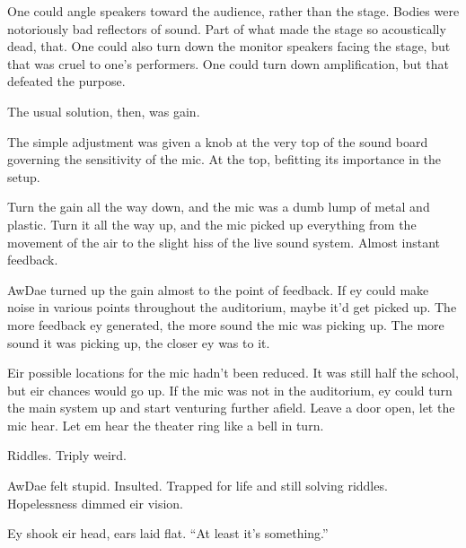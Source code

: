 One could angle speakers toward the audience, rather than the stage. Bodies were notoriously bad reflectors of sound. Part of what made the stage so acoustically dead, that. One could also turn down the monitor speakers facing the stage, but that was cruel to one's performers. One could turn down amplification, but that defeated the purpose.

The usual solution, then, was gain.

The simple adjustment was given a knob at the very top of the sound board governing the sensitivity of the mic. At the top, befitting its importance in the setup.

Turn the gain all the way down, and the mic was a dumb lump of metal and plastic. Turn it all the way up, and the mic picked up everything from the movement of the air to the slight hiss of the live sound system. Almost instant feedback.

AwDae turned up the gain almost to the point of feedback. If ey could make noise in various points throughout the auditorium, maybe it'd get picked up. The more feedback ey generated, the more sound the mic was picking up. The more sound it was picking up, the closer ey was to it.

Eir possible locations for the mic hadn't been reduced. It was still half the school, but eir chances would go up. If the mic was not in the auditorium, ey could turn the main system up and start venturing further afield. Leave a door open, let the mic hear. Let em hear the theater ring like a bell in turn.

Riddles. Triply weird.

AwDae felt stupid. Insulted. Trapped for life and still solving riddles. Hopelessness dimmed eir vision.

Ey shook eir head, ears laid flat. ``At least it's something.''
